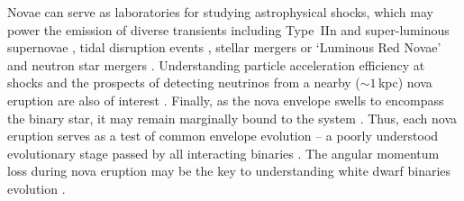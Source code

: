 \documentclass[a4paper,fleqn,usenatbib]{mnras}
\begin{document}
Novae can serve as laboratories for studying astrophysical shocks, 
which may power the emission of diverse 
transients \citep{2020ApJ...904....4F} including Type~IIn and 
super-luminous supernovae \citep[e.g.][]{2014ApJ...788..154O,2018SSRv..214...27C}, 
tidal disruption events \citep{2015ApJ...806..164P}, 
stellar mergers or `Luminous Red Novae' \citep{2017MNRAS.471.3200M} 
and neutron star mergers \citep{2018ApJ...858...53L}. 
Understanding particle acceleration efficiency at shocks \citep{2014ApJ...783...91C,2018MNRAS.479..687S} 
and the prospects of detecting neutrinos from a nearby ($\sim 1$\,kpc) nova eruption 
are also of interest \citep{2010PhRvD..82l3012R,2016MNRAS.457.1786M,2020ApJ...904....4F,2022arXiv220904873G,2022arXiv221206810A}. 
%
Finally, as the nova envelope swells to encompass the binary star, it may remain marginally bound to the system 
\citep[e.g.][]{2016MNRAS.461.2527P}. Thus, 
each nova eruption serves as a test of common envelope evolution
\citep{1991ApJ...374..623S,2021ApJ...914....5S}
-- a poorly understood evolutionary stage passed by all interacting 
binaries \citep{1976IAUS...73...75P,1988ApJ...329..764L,2010MmSAI..81..849R,2013A&ARv..21...59I}. 
%
The angular momentum loss during nova eruption may be the key to understanding 
white dwarf binaries evolution \citep{1998MNRAS.297..633S,2016MNRAS.455L..16S,2021ApJ...923..100M,2022MNRAS.510.6110P}. 
\end{document}
